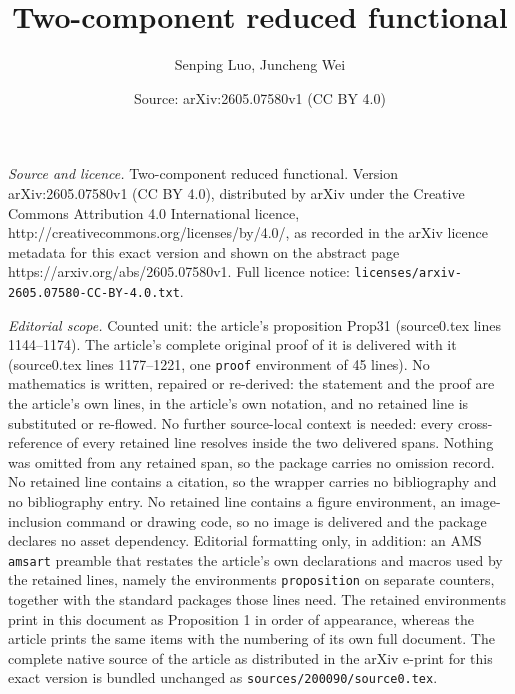 \documentclass[10pt,a4paper]{amsart}
\title{Two-component reduced functional}
\author{Senping Luo, Juncheng Wei}
\date{Source: arXiv:2605.07580v1 (CC BY 4.0)}
\begin{document}
\maketitle

\noindent\emph{Source and licence.} Two-component reduced functional. Version arXiv:2605.07580v1 (CC BY 4.0), distributed by arXiv under the Creative Commons Attribution 4.0 International licence, http://creativecommons.org/licenses/by/4.0/, as recorded in the arXiv licence metadata for this exact version and shown on the abstract page https://arxiv.org/abs/2605.07580v1. Full licence notice: \texttt{licenses/arxiv-2605.07580-CC-BY-4.0.txt}.\par\smallskip

\noindent\textit{Editorial scope.} Counted unit: the article's proposition Prop31 (source0.tex lines 1144--1174). The article's complete original proof of it is delivered with it (source0.tex lines 1177--1221, one \texttt{proof} environment of 45 lines). No mathematics is written, repaired or re-derived: the statement and the proof are the article's own lines, in the article's own notation, and no retained line is substituted or re-flowed.  No further source-local context is needed: every cross-reference of every retained line resolves inside the two delivered spans.  Nothing was omitted from any retained span, so the package carries no omission record.  No retained line contains a citation, so the wrapper carries no bibliography and no bibliography entry.  No retained line contains a figure environment, an image-inclusion command or drawing code, so no image is delivered and the package declares no asset dependency.  Editorial formatting only, in addition: an AMS \texttt{amsart} preamble that restates the article's own declarations and macros used by the retained lines, namely the environments \texttt{proposition} on separate counters, together with the standard packages those lines need.  The retained environments print in this document as Proposition 1 in order of appearance, whereas the article prints the same items with the numbering of its own full document.  The complete native source of the article as distributed in the arXiv e-print for this exact version is bundled unchanged as \texttt{sources/200090/source0.tex}.
\end{document}
